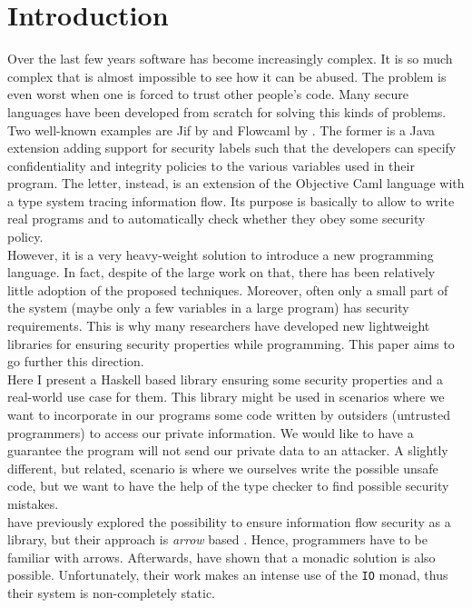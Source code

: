 \section{Introduction}
Over the last few years software has become increasingly complex. It is so much complex that is almost impossible to see how it can be abused. The problem is even worst when one is forced to trust other people's code. Many secure languages have been developed from scratch for solving this kinds of problems. Two well-known examples are Jif \cite{pullicino2014jif} by \citeauthor{pullicino2014jif} and Flowcaml \cite{simonet2003flow} by \citeauthor{simonet2003flow}. The former is a Java extension adding support for security labels such that the developers can specify confidentiality and integrity policies to the various variables used in their program. The letter, instead, is an extension of the Objective Caml language with a type system tracing information flow. Its purpose is basically to allow to write real programs and to automatically check whether they obey some security policy. \\
However, it is a very heavy-weight solution to introduce a new programming language. In fact, despite of the large work on that, there has been relatively little adoption of the proposed techniques. Moreover, often only a small part of the system (maybe only a few variables in a large program) has security requirements. This is why many researchers have developed new lightweight libraries for ensuring security properties while programming. This paper aims to go further this direction. \\
Here I present a Haskell based library ensuring some security properties and a real-world use case for them. This library might be used in scenarios where we want to incorporate in our programs some code written by outsiders (untrusted programmers) to access our private information. We would like to have a guarantee the program will not send our private data to an attacker. A slightly different, but related, scenario is where we ourselves write the possible unsafe code, but we want to have the help of the type checker to find possible security mistakes. \\
\citeauthor{li2006encoding} \cite{li2006encoding} have previously explored the possibility to ensure information flow security as a library, but their approach is \textit{arrow} based \cite{hughes2000generalising}. Hence, programmers have to be familiar with arrows. Afterwards, \citeauthor{russo2008library} \cite{russo2008library} have shown that a monadic solution is also possible. Unfortunately, their work makes an intense use of the \texttt{IO} monad, thus their system is non-completely static. \\
